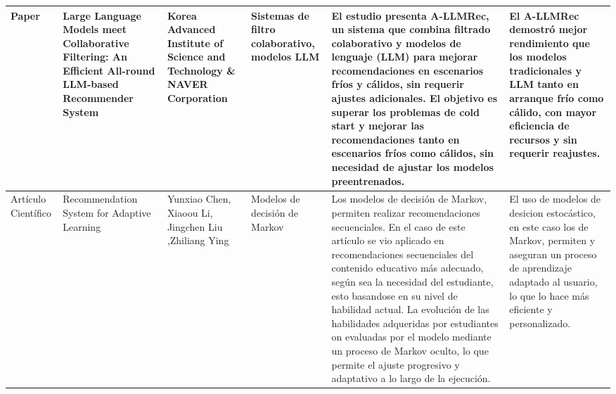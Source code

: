 \documentclass{scrartcl}
\begin{document}
\begin{landscape}
\begin{longtable}{|C{0.1\textwidth}|C{0.15\textwidth}|C{0.15\textwidth}|C{0.1\textwidth}|C{0.4\textwidth}|C{0.25\textwidth}|}
   Paper & Large Language Models meet Collaborative Filtering: An Efficient All-round LLM-based Recommender System & Korea Advanced Institute of Science and Technology \& NAVER Corporation & Sistemas de filtro colaborativo, modelos LLM & El estudio presenta A-LLMRec, un sistema que combina filtrado colaborativo y modelos de lenguaje (LLM) para mejorar recomendaciones en escenarios fríos y cálidos, sin requerir ajustes adicionales. El objetivo es superar los problemas de cold start y mejorar las recomendaciones tanto en escenarios fríos como cálidos, sin necesidad de ajustar los modelos preentrenados. & El A-LLMRec demostró mejor rendimiento que los modelos tradicionales y LLM tanto en arranque frío como cálido, con mayor eficiencia de recursos y sin requerir reajustes. \\ \hline
   Artículo Científico & Recommendation System for Adaptive Learning & Yunxiao Chen, Xiaoou Li, Jingchen Liu ,Zhiliang Ying & Modelos de decisión de Markov & Los modelos de decisión de Markov, permiten realizar recomendaciones secuenciales. En el caso de este artículo se vio aplicado en recomendaciones secuenciales del contenido educativo más adecuado, según sea la necesidad del estudiante, esto basandose en su nivel de habilidad actual. La evolución de las habilidades adqueridas por estudiantes on evaluadas por el modelo mediante un proceso de Markov oculto, lo que permite el ajuste progresivo y adaptativo a lo largo de la ejecución. & El uso de modelos de desicion estocástico, en este caso los de Markov, permiten y aseguran un proceso de aprendizaje adaptado al usuario, lo que lo hace más eficiente y personalizado. \\ \hline
  \end{longtable}


\end{landscape}
\end{document}
